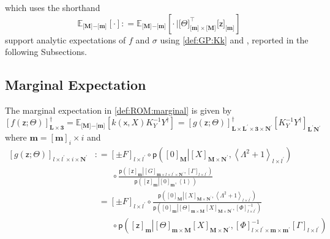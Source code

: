 \documentclass[preprint,12pt]{elsarticle}
\newcommand*{\M}[1]{\ensuremath{#1}\xspace}
\newcommand*{\x}{\times}
\newcommand*{\mi}[1]{\mathbf{#1}}
\newcommand*{\rv}[1]{\mathsf{#1}}
\newcommand*{\te}[2][]{\left\lbrack{#2}\right\rbrack_{#1}}
\newcommand*{\tte}[2][]{\lbrack{#2}\rbrack_{#1}}
\newcommand*{\tse}[2][]{\mi{\lbrack#2\rbrack}_{#1}}
\newcommand*{\tme}[3][]{\lbrack{#3}\rbrack_{\tse[#1]{#2}}}
\newcommand*{\diag}[2][]{\left\langle{#2}\right\rangle_{#1}}
\newcommand*{\prob}[3]{\M{\mathsf{p}\!\left(\left.{#1}\right\vert{#2,#3}\right)}}
\newcommand*{\deq}{\M{\mathrel{\mathop:}=}}
\newcommand*{\ev}[3][]{\mathbb{E}_{#3}^{#1}\!\left\lbrack{#2}\right\rbrack}
\newcommand*{\evt}[3][]{\mathbb{E}_{#3}^{#1}\!#2}
\begin{document}
    which uses the shorthand
    \begin{equation*}
        \ev{\cdot }{\tse{M}\mi{-}\tse{m}} \deq
        \ev{\cdot \,
        \big\vert \tte[\tse{m}\x\tse{M}]{\Theta}^{\intercal} \tme{m}{\rv{z}}}
        {\tse{M}\mi{-}\tse{m}}
    \end{equation*}
     support analytic expectations of $f$ and $\sigma$ using 
    \cref{def:GP:Kk} and , reported in the following Subsections.

    \subsection{Marginal Expectation} \label{sub:ROM:Expectation}
        The marginal expectation in \cref{def:ROM:marginal} is given by
        \begin{equation*}
            \te[\mi{L\x 3}]{f({\rv{z}}; \Theta)}^{\dagger}
            = \evt{\te{k(\rv{x},X) K_{Y}^{-1} Y^{\dagger}}}{\tse{M}\mi{-}\tse{m}}
            = \te[\mi{L}\x\mi{L^{\prime}}\x \mi{3} \x\mi{N^{\prime}}]{g({\rv{z}}; \Theta)}^{\dagger}
            \te[\mi{L^{\prime}N^{\prime}}]{K_{Y}^{-1} Y^{\dagger}}
        \end{equation*}
        where $\mi{m} = \te[i]{\mi{m}}\x i$ and
        \begin{equation*}
            \begin{aligned}
                \te[l\x l^{\prime}\x i \x\mi{N^{\prime}}]{g({\rv{z}}; \Theta)} 
                &\deq \te[l\x l^{\prime}]{\pm F} \circ 
                \prob{\te[\mi{M}]{0}}{\te[\mi{M}\x\mi{N^{\prime}}]{X}}
                {\diag[l\x l^{\prime}]{\Lambda^{2}+1}} \\
                & \phantom{\deq\ } \circ \frac
                {\prob{\te[\mi{m}]{\rv{z}}}{\te[\mi{m}\x l\x l^{\prime}\x\mi{N^{\prime}}]{G}}{\te[l\x l^{\prime}]{\Gamma}}}
                {\prob{\te[\mi{m}]{\rv{z}}}{\te[\mi{m}]{0}}{\diag[]{1}}} \\
                &\phantom{:}= \te[l\x l^{\prime}]{\pm F} \circ 
                \frac
                {\prob{\te[\mi{M}]{0}}{\te[\mi{M}\x\mi{N^{\prime}}]{X}}
                {\diag[l\x l^{\prime}]{\Lambda^{2}+1}}} 
                {\prob{\te[\mi{m}]{0}}{\te[\mi{m}\x\mi{M}]{\Theta}\te[\mi{M}\x\mi{N^{\prime}}]{X}}
                {\te[l\x l^{\prime}]{\Phi}^{-1}}} \\
                & \phantom{\deq\ } \circ
                {\prob{\te[\mi{m}]{\rv{z}}}{\te[\mi{m}\x\mi{M}]{\Theta}\te[\mi{M}\x\mi{N^{\prime}}]{X}}
                {\te[l\x l^{\prime}\x\mi{m}\x\mi{m^{\prime}}]{\Phi}^{-1}\te[l\x l^{\prime}]{\Gamma}}}
            \end{aligned}                    
        \end{equation*}
\end{document}
